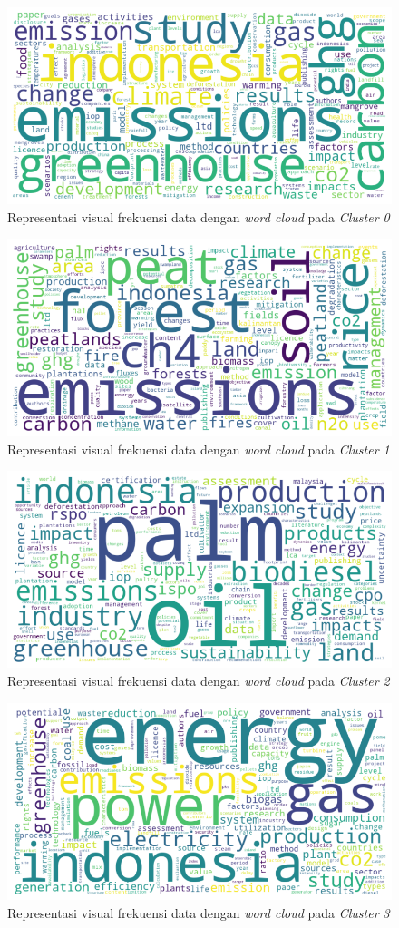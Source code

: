 \begin{figure}[H]
    \centering
    \includegraphics[width=0.6\linewidth]{img/4-31-1.png}
    \caption{Representasi visual frekuensi data dengan \textit{word cloud} pada \textit{Cluster 0}}
    \label{fig:4-31-1}
\end{figure}
\begin{figure}[H]
    \centering
    \includegraphics[width=0.6\linewidth]{img/4-31-2.png}
    \caption{Representasi visual frekuensi data dengan \textit{word cloud} pada \textit{Cluster 1}}
    \label{fig:4-31-2}
\end{figure}
\begin{figure}[H]
    \centering
    \includegraphics[width=0.6\linewidth]{img/4-31-3.png}
    \caption{Representasi visual frekuensi data dengan \textit{word cloud} pada \textit{Cluster 2}}
    \label{fig:4-31-3}
\end{figure}
\begin{figure}[H]
    \centering
    \includegraphics[width=0.6\linewidth]{img/4-31-4.png}
    \caption{Representasi visual frekuensi data dengan \textit{word cloud} pada \textit{Cluster 3}}
    \label{fig:4-31-4}
\end{figure}

